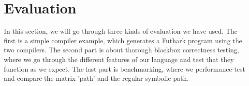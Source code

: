 \section{Evaluation}
In this section, we will go through three kinds of evaluation we have used. The
first is a simple compiler example, which generates a Futhark program using the
two compilers. The second part is about thorough blackbox correctness testing,
where we go through the different features of our language and test that they
function as we expect. The last part is benchmarking, where we performance-test
and compare the matrix 'path' and the regular symbolic path.



